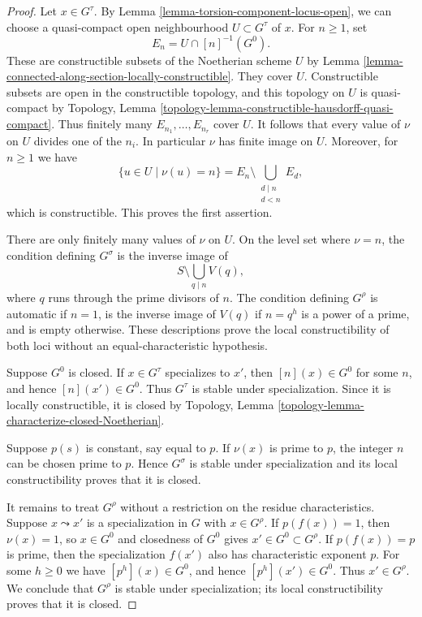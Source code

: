 \begin{proof}
Let $x \in G^\tau$. By Lemma
\ref{lemma-torsion-component-locus-open}, we can choose a quasi-compact
open neighbourhood $U \subset G^\tau$ of $x$. For $n \geq 1$, set
$$
E_n = U \cap [n]^{-1}(G^0).
$$
These are constructible subsets of the Noetherian scheme $U$ by
Lemma \ref{lemma-connected-along-section-locally-constructible}. They cover
$U$. Constructible subsets are open in the constructible topology, and this
topology on $U$ is quasi-compact by Topology, Lemma
\ref{topology-lemma-constructible-hausdorff-quasi-compact}. Thus finitely many
$E_{n_1}, \ldots, E_{n_r}$ cover $U$. It follows that every value of $\nu$
on $U$ divides one of the $n_i$. In particular $\nu$ has finite image on
$U$. Moreover, for $n \geq 1$ we have
$$
\{u \in U \mid \nu(u)=n\} =
E_n \setminus \bigcup_{\substack{d \mid n \\ d < n}} E_d,
$$
which is constructible. This proves the first assertion.

There are only finitely many values of $\nu$ on $U$. On the level set where
$\nu=n$, the condition defining $G^\sigma$ is the inverse image of
$$
S\setminus\bigcup_{q\mid n}V(q),
$$
where $q$ runs through the prime divisors of $n$. The condition defining
$G^\rho$ is automatic if $n=1$, is the inverse image of $V(q)$ if
$n=q^h$ is a power of a prime, and is empty otherwise. These descriptions
prove the local constructibility of both loci without an
equal-characteristic hypothesis.

Suppose $G^0$ is closed. If $x \in G^\tau$ specializes to $x'$, then
$[n](x) \in G^0$ for some $n$, and hence $[n](x') \in G^0$. Thus
$G^\tau$ is stable under specialization. Since it is locally constructible,
it is closed by Topology, Lemma
\ref{topology-lemma-characterize-closed-Noetherian}.

Suppose $p(s)$ is constant, say equal to $p$. If $\nu(x)$ is prime to $p$,
the integer $n$ can be chosen prime to $p$. Hence $G^\sigma$ is stable under
specialization and its local constructibility proves that it is closed.

It remains to treat $G^\rho$ without a restriction on the residue
characteristics. Suppose $x \leadsto x'$ is a specialization in $G$ with
$x \in G^\rho$. If $p(f(x))=1$, then $\nu(x)=1$, so $x\in G^0$ and closedness
of $G^0$ gives $x'\in G^0\subset G^\rho$. If $p(f(x))=p$ is prime, then the
specialization $f(x')$ also has characteristic exponent $p$. For some
$h\geq 0$ we have $[p^h](x)\in G^0$, and hence
$[p^h](x')\in G^0$. Thus $x'\in G^\rho$. We conclude that $G^\rho$ is stable
under specialization; its local constructibility proves that it is closed.
\end{proof}

